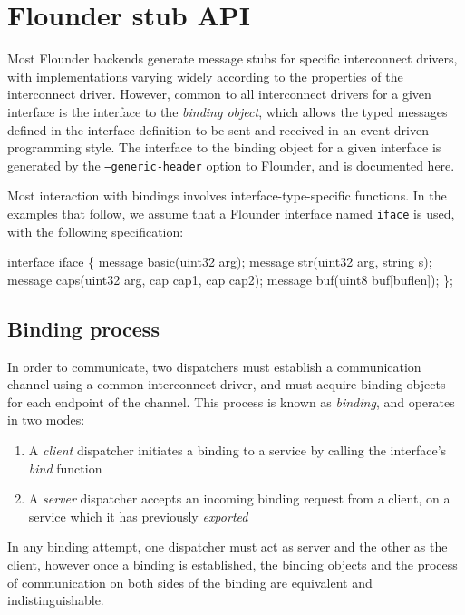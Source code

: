 \documentclass[a4paper,twoside]{report} %
\begin{document}
\chapter{Flounder stub API}

Most Flounder backends generate message stubs for specific interconnect
drivers, with implementations varying widely according to the properties of
the interconnect driver. However, common to all interconnect drivers for a
given interface is the interface to the \emph{binding object}, which allows
the typed messages defined in the interface definition to be sent and received
in an event-driven programming style. The interface to the binding object for
a given interface is generated by the \texttt{--generic-header} option to
Flounder, and is documented here.

Most interaction with bindings involves interface-type-specific functions.
In the examples that follow, we assume that a Flounder interface
named \texttt{iface} is used, with the following specification:

\begin{example}
interface iface \{
  message basic(uint32 arg);
  message str(uint32 arg, string s);
  message caps(uint32 arg, cap cap1, cap cap2);
  message buf(uint8 buf[buflen]);
\};
\end{example}


\section{Binding process}\label{sec:binding_bindingproc}

In order to communicate, two dispatchers must establish a communication channel
using a common interconnect driver, and must acquire binding objects for each
endpoint of the channel. This process is known as \emph{binding}, and operates
in two modes:

\begin{enumerate}
 \item A \emph{client} dispatcher initiates a binding to a service by calling
       the interface's \emph{bind} function
 \item A \emph{server} dispatcher accepts an incoming binding request from a
       client, on a service which it has previously \emph{exported}
\end{enumerate}

In any binding attempt, one dispatcher must act as server and the other as
the client, however once a binding is established, the binding objects and the
process of communication on both sides of the binding are equivalent and
indistinguishable.
\end{document}
